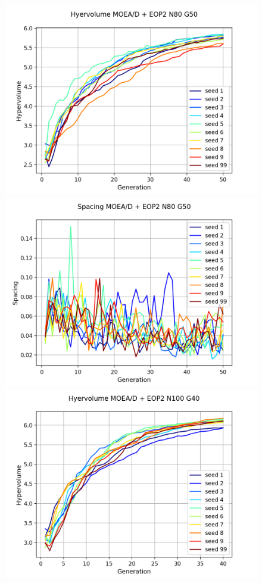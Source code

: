 \begin{figure}[H]
\includegraphics[scale=0.43]{figures/METRICS_EOP2/Hypervol_N80_G50.png}\quad 
\includegraphics[scale=0.43]{figures/METRICS_EOP2/Spacing_N80_G50.png}\\
\includegraphics[scale=0.43]{figures/METRICS_EOP2/Hypervol_N100_G40.png}\quad 

\end{figure}
